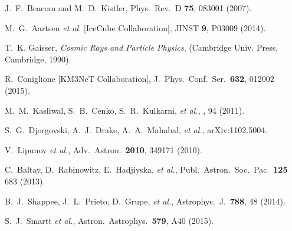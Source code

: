 \documentclass[aps,prd,nofootinbib,twocolumn,floatfix,letterpaper,superscriptaddress,showpacs]{revtex4}
\begin{document}
\begin{thebibliography}{99}
  J.~F.~Beacom and M.~D.~Kistler,
  Phys.\ Rev.\ D {\bf 75}, 083001 (2007).




  M.~G.~Aartsen {\it et al.} [IceCube Collaboration],
  JINST {\bf 9}, P03009 (2014).

T.~K. Gaisser, \textit{Cosmic Rays and Particle Physics},
(Cambridge Univ. Press, Cambridge, 1990).


  R.~Coniglione [KM3NeT Collaboration],
  J.\ Phys.\ Conf.\ Ser.\  {\bf 632}, 012002 (2015).



  M.~M.~Kasliwal, S.~B.\ Cenko, S.~R.\ Kulkarni, {\it et al.},
  , 94 (2011).


  S.~G.~Djorgovski, A.~J.~Drake, A.~A.~Mahabal, {\it et al.},
  arXiv:1102.5004.


  V.~Lipunov {\it et al.},
  Adv.\ Astron.\  {\bf 2010}, 349171 (2010).

 C.\ Baltay, D.\ Rabinowitz, E.\ Hadjiyska, {\it et al.},
 Publ.\ Astron.\ Soc.\ Pac.\ {\bf 125} 683 (2013).

  B.~J.~Shappee,  J.~L.\ Prieto, D.\ Grupe, {\it et al.},
  Astrophys.\ J.\  {\bf 788}, 48 (2014).

  S.~J.~Smartt {\it et al.},
  Astron.\ Astrophys.\  {\bf 579}, A40 (2015).






\end{thebibliography}
\end{document}
